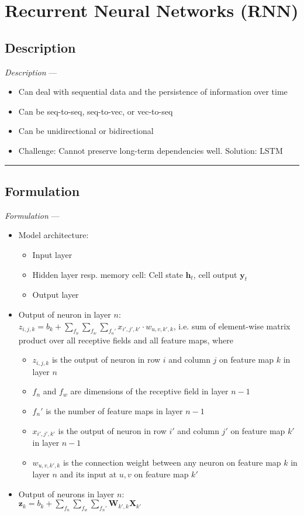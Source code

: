 \section{Recurrent Neural Networks (RNN)}
\subsection*{Description}
\emph{Description} --- 
\begin{itemize}
    \item Can deal with sequential data and the persistence of information over time
    \item Can be seq-to-seq, seq-to-vec, or vec-to-seq
    \item Can be unidirectional or bidirectional
    \item Challenge: Cannot preserve long-term dependencies well. Solution: LSTM
\end{itemize}

{\color{black}\hrule height 0.001mm}

\subsection*{Formulation}
\emph{Formulation} --- 
\begin{itemize}
    \item Model architecture: 
    \begin{itemize}
        \item Input layer
        \item Hidden layer resp. memory cell: Cell state $\boldsymbol{h}_t$, cell output $\boldsymbol{y}_t$
        \item Output layer
    \end{itemize}
    \item Output of neuron in layer $n$: \\
    $z_{i,j,k} = b_k + \sum_{f_n} \sum_{f_w} \sum_{f_n'} x_{i',j',k'} \cdot w_{u,v,k',k}$, i.e. sum of element-wise matrix product over all receptive fields and all feature maps, where
    \begin{itemize}
        \item $z_{i,j,k}$ is the output of neuron in row $i$ and column $j$ on feature map $k$ in layer $n$
        \item $f_n$ and $f_w$ are dimensions of the receptive field in layer $n-1$
        \item $f_n'$ is the number of feature maps in layer $n-1$
        \item $x_{i',j',k'}$ is the output of neuron in row $i'$ and column $j'$ on feature map $k'$ in layer $n-1$
        \item $w_{u,v,k',k}$ is the connection weight between any neuron on feature map $k$ in layer $n$ and its input at $u,v$ on feature map $k'$
    \end{itemize}
    \item Output of neurons in layer $n$: \\
    $\boldsymbol{z}_k = b_k + \sum_{f_n} \sum_{f_w} \sum_{f_n'} \boldsymbol{W}_{k',k} \boldsymbol{X}_{k'}$
\end{itemize}


